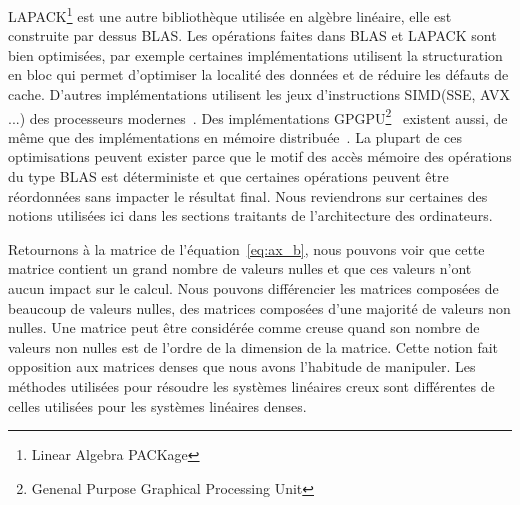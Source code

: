 LAPACK\footnote{Linear Algebra PACKage} est une autre bibliothèque utilisée en algèbre linéaire, elle est construite par dessus BLAS.
%
Les opérations faites dans BLAS et LAPACK sont bien optimisées, par exemple certaines implémentations utilisent la structuration en bloc qui permet d'optimiser la localité des données et de réduire les défauts de cache.
%
D'autres implémentations utilisent les jeux d'instructions SIMD(SSE, AVX ...) des processeurs modernes~\cite{intel_mkl}.
%
Des implémentations GPGPU\footnote{Genenal Purpose Graphical Processing Unit}~\cite{nvidia_cublas} existent aussi, de même que des implémentations en mémoire distribuée~\cite{dplasma}.
%
La plupart de ces optimisations peuvent exister parce que le motif des accès mémoire des opérations du type BLAS est déterministe et que certaines opérations peuvent être réordonnées sans impacter le résultat final.
%
Nous reviendrons sur certaines des notions utilisées ici dans les sections traitants de l'architecture des ordinateurs.


Retournons à la matrice de l'équation~\eqref{eq:ax_b}, nous pouvons voir que cette matrice contient un grand nombre de valeurs nulles et que ces valeurs n'ont aucun impact sur le calcul.
%
Nous pouvons différencier les matrices composées de beaucoup de valeurs nulles, des matrices composées d'une majorité de valeurs non nulles.
%
Une matrice peut être considérée comme creuse quand son nombre de valeurs non nulles est de l'ordre de la dimension de la matrice.
%
Cette notion fait opposition aux matrices denses que nous avons l'habitude de manipuler.
%
Les méthodes utilisées pour résoudre les systèmes linéaires creux sont différentes de celles utilisées pour les systèmes linéaires denses.
